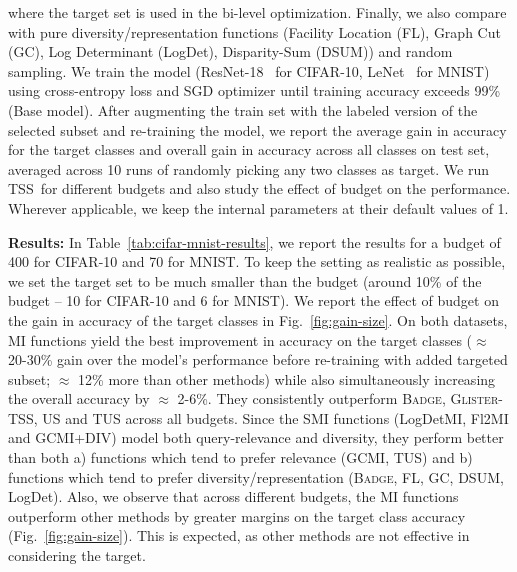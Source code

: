\documentclass{article}
\newcommand{\modelss}{\mbox{\textsc{TSS}}}
\begin{document}
where the target set is used in the bi-level optimization. Finally, we also compare with pure diversity/representation functions (Facility Location (FL), Graph Cut (GC), Log Determinant (LogDet), Disparity-Sum (DSUM)) and random sampling. We train the model (ResNet-18~\citep{he2016deep} for CIFAR-10, LeNet~\citep{lecun1989backpropagation} for MNIST) using cross-entropy loss and SGD optimizer until training accuracy exceeds 99\% (Base model). After augmenting the train set with the labeled version of the selected subset and re-training the model, we report the average gain in accuracy for the target classes and overall gain in accuracy across all classes on test set, averaged across 10 runs of randomly picking any two classes as target. We run \modelss\ for different budgets and also study the effect of budget on the performance. Wherever applicable, we keep the internal parameters at their default values of 1. %

\textbf{Results: } In Table~\ref{tab:cifar-mnist-results}, we report the results for a budget of 400 for CIFAR-10 and 70 for MNIST. To keep the setting as realistic as possible, we set the target set to be much smaller than the budget (around 10\% of the budget -- 10 for CIFAR-10 and 6 for MNIST). We report the effect of budget on the gain in accuracy of the target classes in Fig.~\ref{fig:gain-size}. On both datasets, MI functions yield the best improvement in accuracy on the target classes ($\approx$ 20-30\% gain over the model's performance before re-training with added targeted subset; $\approx$ 12\% more than other methods) while also simultaneously increasing the overall accuracy by $\approx$ 2-6\%. They consistently outperform \textsc{Badge}, \textsc{Glister-TSS}, \textsc{US} and \textsc{TUS} across all budgets. 
Since the SMI functions (LogDetMI, Fl2MI and GCMI+DIV) model both query-relevance and diversity, they perform better than both a) functions which tend to prefer relevance (GCMI, TUS) and b) functions which tend to prefer diversity/representation (\textsc{Badge}, FL, GC, DSUM, LogDet). 
Also, we observe that across different budgets, the MI functions outperform other methods by greater margins on the target class accuracy (Fig.~\ref{fig:gain-size}).
This is expected, as other methods are not effective in considering the target. 
\end{document}
